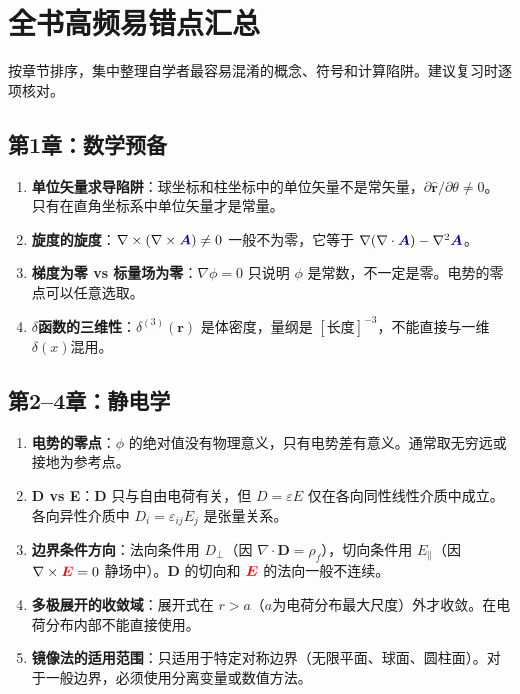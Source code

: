 \documentclass[11pt,a4paper,openany,oneside]{book}
\newcommand{\vecE}{\textcolor{red}{\vect{E}}}
\newcommand{\vecA}{\textcolor{blue!70!black}{\vect{A}}}
\newcommand{\eps}{\varepsilon}
\newcommand{\vect}[1]{\bm{#1}}
\newcommand{\unitvec}[1]{\hat{\vect{#1}}}
\newcommand{\grad}{\nabla}
\newcommand{\curl}{\nabla\times}
\newcommand{\divg}{\nabla\cdot}
\newcommand{\lap}{\nabla^2}
\begin{document}
\chapter{全书高频易错点汇总}

按章节排序，集中整理自学者最容易混淆的概念、符号和计算陷阱。建议复习时逐项核对。

\section{第1章：数学预备}

\begin{enumerate}
\item \textbf{单位矢量求导陷阱}：球坐标和柱坐标中的单位矢量不是常矢量，$\partial\unitvec{r}/\partial\theta\neq 0$。只有在直角坐标系中单位矢量才是常量。
\item \textbf{旋度的旋度}：$\nabla\times(\nabla\times\vecA)\neq 0$ 一般不为零，它等于 $\grad(\divg\vecA)-\lap\vecA$。
\item \textbf{梯度为零 vs 标量场为零}：$\grad\phi=0$ 只说明 $\phi$ 是常数，不一定是零。电势的零点可以任意选取。
\item \textbf{$\delta$函数的三维性}：$\delta^{(3)}(\vect{r})$ 是体密度，量纲是 $[\text{长度}]^{-3}$，不能直接与一维$\delta(x)$混用。
\end{enumerate}

\section{第2--4章：静电学}

\begin{enumerate}
\item \textbf{电势的零点}：$\phi$ 的绝对值没有物理意义，只有电势差有意义。通常取无穷远或接地为参考点。
\item \textbf{D vs E}：$\vect{D}$ 只与自由电荷有关，但 $D=\eps E$ 仅在各向同性线性介质中成立。各向异性介质中 $D_i=\eps_{ij}E_j$ 是张量关系。
\item \textbf{边界条件方向}：法向条件用 $D_\perp$（因 $\divg\vect{D}=\rho_f$），切向条件用 $E_\parallel$（因 $\curl\vecE=0$ 静场中）。$\vect{D}$ 的切向和 $\vecE$ 的法向一般不连续。
\item \textbf{多极展开的收敛域}：展开式在 $r>a$（$a$为电荷分布最大尺度）外才收敛。在电荷分布内部不能直接使用。
\item \textbf{镜像法的适用范围}：只适用于特定对称边界（无限平面、球面、圆柱面）。对于一般边界，必须使用分离变量或数值方法。
\end{enumerate}
\end{document}
